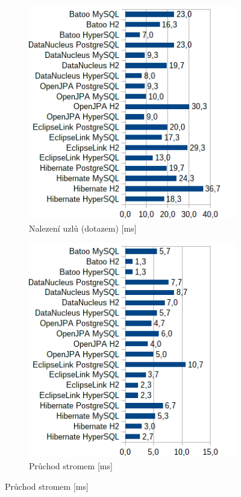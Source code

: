\begin{figure}\ContinuedFloat
  \begin{subfigure}[b]{1\textwidth}
  \includegraphics[width=25em]{obr/bench/jpa7}
  \caption{Nalezení uzlů (dotazem) [ms]}\label{img:jpa7}
  \end{subfigure}
  \begin{subfigure}[b]{1\textwidth}
  \includegraphics[width=25em]{obr/bench/jpa8}
  \caption{Průchod stromem [ms]}\label{img:jpa8}
  \end{subfigure}
\end{figure}

